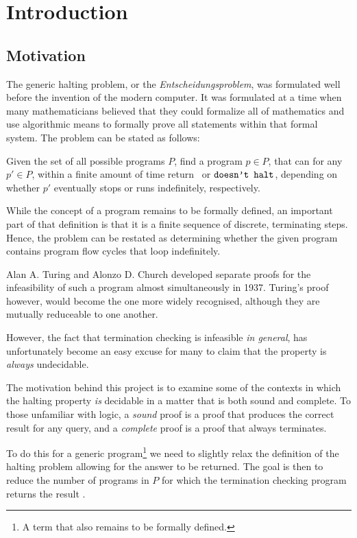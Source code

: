 \chapter{Introduction}\label{section:introduction}

\section{Motivation}

The generic halting problem, or the \emph{Entscheidungsproblem}, was formulated
well before the invention of the modern computer. It was formulated at a time
when many mathematicians believed that they could formalize all of mathematics
and use algorithmic means to formally prove all statements within that formal
system. The problem can be stated as follows:

\begin{definition} Given the set of all possible programs $P$, find a program
$p\in P$, that can for any $p'\in P$,  within a finite amount of time return
\ or $\text{{\ttfamily doesn't halt}}$, depending on whether $p'$
eventually stops or runs indefinitely, respectively.\end{definition}
 
While the concept of a program remains to be formally defined, an important
part of that definition is that it is a finite sequence of discrete,
terminating steps. Hence, the problem can be restated as determining whether
the given program contains program flow cycles that loop indefinitely.

Alan A. Turing and Alonzo D. Church developed separate proofs for the
infeasibility of such a program almost simultaneously in 1937. Turing's proof
however, would become the one more widely recognised, although they are
mutually reduceable to one another.

However, the fact that termination checking is infeasible \emph{in general},
has unfortunately become an easy excuse for many to claim that the property is
\emph{always} undecidable. 

The motivation behind this project is to examine some of the contexts in which
the halting property \emph{is} decidable in a matter that is both sound and
complete. To those unfamiliar with logic, a \emph{sound} proof is a proof that
produces the correct result for any query, and a \emph{complete} proof is a
proof that always terminates.

To do this for a generic program\footnote{A term that also remains to be
formally defined.} we need to slightly relax the definition of the halting
problem allowing for the answer  to be returned. The goal is then
to reduce the number of programs in $P$ for which the termination checking
program returns the result .

